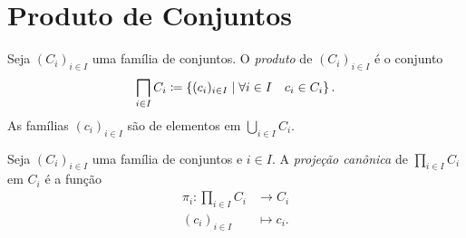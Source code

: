 \cleardoublepage
\section{Produto de Conjuntos}

   \begin{defi}
Seja $(C_i)_{i \in I}$ uma família de conjuntos. O \emph{produto} de $(C_i)_{i \in I}$ é o conjunto
	\begin{equation*}
	\prod_{i \in I} C_i \coloneqq \set{(c_i)_{i \in I}}{\forall i \in I \quad c_i \in C_i}.
	\end{equation*}
As famílias $(c_i)_{i \in I}$ são de elementos em $\bigcup_{i \in I} C_i$.
\end{defi}

\begin{defi}
Seja $(C_i)_{i \in I}$ uma família de conjuntos e $i \in I$. A \emph{projeção canônica} de $\prod_{i \in I} C_i$ em $C_i$ é a função
	\begin{align*}
	\pi_i: \prod_{i \in I} C_i &\to C_i \\
			(c_i)_{i \in I} &\mapsto c_i.
	\end{align*}
\end{defi}

